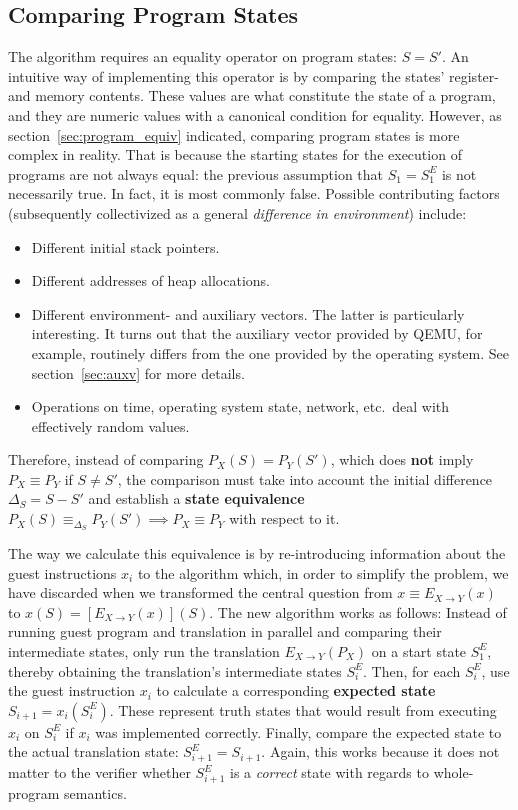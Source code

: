\subsection{Comparing Program States}\label{sec:comparison}

The algorithm requires an equality operator on program states: $S = S'$. An intuitive way of implementing this operator
is by comparing the states' register- and memory contents. These values are what constitute the state of a program, and
they are numeric values with a canonical condition for equality. However, as section~\ref{sec:program_equiv} indicated,
comparing program states is more complex in reality. That is because the starting states for the execution of programs
are not always equal: the previous assumption that $S_1 = S^E_1$ is not necessarily true. In fact, it is most commonly
false.  Possible contributing factors (subsequently collectivized as a general \textit{difference in environment})
include:

\begin{itemize}
    \item Different initial stack pointers.
    \item Different addresses of heap allocations.
    \item Different environment- and auxiliary vectors. The latter is particularly interesting. It turns out that
        the auxiliary vector provided by QEMU, for example, routinely differs from the one provided by the operating
        system. See section~\ref{sec:auxv} for more details.
    \item Operations on time, operating system state, network, etc.\ deal with effectively random values.
\end{itemize}

Therefore, instead of comparing $P_X(S) = P_Y(S')$, which does \textbf{not} imply $P_X \equiv P_Y$ if $S \neq S'$, the
comparison must take into account the initial difference $\Delta_S = S - S'$ and establish a \textbf{state equivalence}
$P_X(S) \equiv_{\Delta_S} P_Y(S') \implies P_X \equiv P_Y$ with respect to it.

The way we calculate this equivalence is by re-introducing information about the guest instructions $x_i$ to the
algorithm which, in order to simplify the problem, we have discarded when we transformed the central question from $x
\equiv E_{X \rightarrow Y}(x)$ to $x(S) = [E_{X \rightarrow Y}(x)](S)$. The new algorithm works as follows: Instead of
running guest program and translation in parallel and comparing their intermediate states, only run the translation
$E_{X \rightarrow Y}(P_X)$ on a start state $S^E_1$, thereby obtaining the translation's intermediate states $S^E_i$.
Then, for each $S^E_i$, use the guest instruction $x_i$ to calculate a corresponding \textbf{expected state} $S_{i+1} =
x_i(S^E_i)$. These represent truth states that would result from executing $x_i$ on $S^E_i$ if $x_i$ was implemented
correctly. Finally, compare the expected state to the actual translation state: $S^E_{i+1} = S_{i+1}$. Again, this works
because it does not matter to the verifier whether $S^E_{i+1}$ is a \textit{correct} state with regards to whole-program
semantics.

